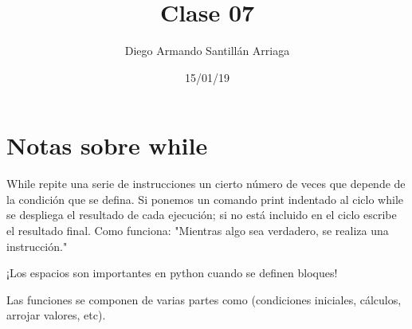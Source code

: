 \documentclass[letterpaper, 12pt, oneside]{article}%
\title{\Huge Clase 07}
\author{Diego Armando Santillán Arriaga}
\date{15/01/19}
\begin{document}
	\maketitle
	\newpage
	\section{Notas sobre while}
	While repite una serie de instrucciones un cierto número de veces que depende de la condición que se defina. Si ponemos un comando print indentado al ciclo while se despliega el resultado de cada ejecución; si no está incluido en el ciclo escribe el resultado final. 
	Como funciona:
	"Mientras algo sea verdadero, se realiza una instrucción."
	
	¡Los espacios son importantes en python cuando se definen bloques!
	
	Las funciones se componen de varias partes como (condiciones iniciales, cálculos, arrojar valores, etc).
	
\end{document}
